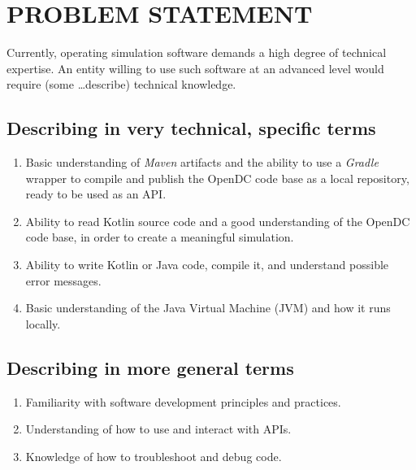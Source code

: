 \section{PROBLEM STATEMENT}

Currently, operating simulation software demands a high degree of technical expertise.
An entity willing to use such software at an advanced level would require (some \ldots describe) technical knowledge.

\subsection{Describing in very technical, specific terms}

\begin{enumerate}
    \item Basic understanding of \textit{Maven} artifacts and the ability to use a \textit{Gradle} wrapper to compile and publish the OpenDC code base as a local repository, ready to be used as an API.
    \item Ability to read Kotlin source code and a good understanding of the OpenDC code base, in order to create a meaningful simulation.
    \item Ability to write Kotlin or Java code, compile it, and understand possible error messages.
    \item Basic understanding of the Java Virtual Machine (JVM) and how it runs locally.
\end{enumerate}

\subsection{Describing in more general terms}

\begin{enumerate}
    \item Familiarity with software development principles and practices.
    \item Understanding of how to use and interact with APIs.
    \item Knowledge of how to troubleshoot and debug code.
\end{enumerate}
